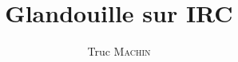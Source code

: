\documentclass[a4paper,french,12pt]{memoir}
\title{Glandouille sur IRC}
\author{Truc \textsc{Machin}}
\begin{document}


~
\pagebreak

\tableofcontents
\clearpage









\appendix


\end{document}
